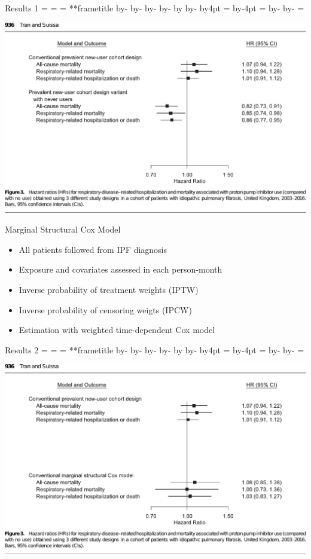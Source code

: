 \documentclass[aspectratio=169,12pt]{beamer} %
\makeatletter
\newif\ifsidebartheme
\newcommand*{\calculatespace}{%
    \contentheight=\paperheight%
    \ifx\beamer@frametitle\@empty%
        \setbox\@tempboxa=\box\voidb@x%
      \else%
        \setbox\@tempboxa=\vbox{%
          \vbox{}%
          {\parskip0pt\usebeamertemplate***{frametitle}}%
        }%
        \ifsidebartheme%
          \advance\contentheight by-1em%
        \fi%
      \fi%
    \advance\contentheight by-\ht\@tempboxa%
    \advance\contentheight by-\dp\@tempboxa%
    \advance\contentheight by-\beamer@frametopskip%
    \ifbeamer@plainframe%
    \contentbottom=0pt%
    \else%
    \advance\contentheight by-\headheight%
    \advance\contentheight by\headdp%
    \advance\contentheight by-\footheight%
    \advance\contentheight by4pt%
    \contentbottom=\footheight%
    \advance\contentbottom by-4pt%
    \fi%
    \contentwidth=\paperwidth%
    \ifbeamer@plainframe%
    \contentleft=0pt%
    \else%
    \advance\contentwidth by-\beamer@rightsidebar%
    \advance\contentwidth by-\beamer@leftsidebar\relax%
    \contentleft=\beamer@leftsidebar%
    \fi%
}
\makeatother
\begin{document}
\begin{frame}{Results 1}
    \calculatespace%
    \begin{center}
	\includegraphics[height=0.90\contentheight]{ref/suissa-fig3-pnuc.pdf}
    \end{center}
\end{frame}

\begin{frame}{Marginal Structural Cox Model}
    \begin{itemize}
	\item All patients followed from IPF diagnosis
	\item Exposure and covariates assessed in each person-month
	\item Inverse probability of treatment weights (IPTW)
	\item Inverse probability of censoring weigts (IPCW)
	\item Estimation with weighted time-dependent Cox model
    \end{itemize}
\end{frame}

\begin{frame}{Results 2}
    \calculatespace%
    \begin{center}
	\includegraphics[height=0.90\contentheight]{ref/suissa-fig3-mscm.pdf}
    \end{center}
\end{frame}
\end{document}
